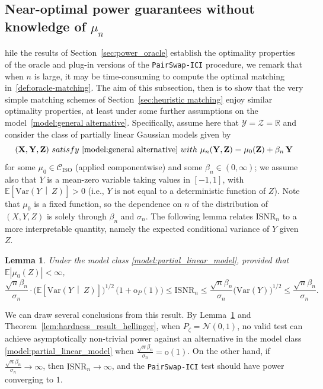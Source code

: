 \documentclass[12pt]{article}
\newtheorem{lemma}[theorem]{Lemma}
\newcommand{\R}{\mathbb{R}}
\newcommand{\EE}[1]{\mathbb{E}\left[{#1}\right]}
\newcommand{\VVst}[2]{\mathrm{Var}\left({#1}\  \middle| \ {#2}\right)}
\newcommand{\ISNR}{\mathrm{ISNR}}
\newcommand{\ISO}{\mathrm{ISO}}
\newcommand{\Ycal}{\mathcal{Y}}
\newcommand{\Zcal}{\mathcal{Z}}
\newcommand{\bX}{\mathbf{X}}
\newcommand{\bY}{\mathbf{Y}}
\newcommand{\bZ}{\mathbf{Z}}
\begin{document}
 
\subsection{Near-optimal power guarantees without knowledge of \texorpdfstring{$\mu_n$}{mu}}\label{sec:partial_linear_model}

hile the results of Section~\ref{sec:power_oracle} establish the optimality properties of the oracle and plug-in versions of the \texttt{PairSwap-ICI} procedure, we remark that when $n$ is large, it may be time-consuming to compute the optimal matching in~\eqref{def:oracle-matching}.   The aim of this subsection, then is to show that the very simple matching schemes of Section~\ref{sec:heuristic matching} enjoy similar optimality properties, at least under some further assumptions on the model~\eqref{model:general alternative}.  Specifically, assume here that $\Ycal = \Zcal=\R$ and consider the class of partially linear Gaussian models given by
\begin{equation}\label{model:partial_linear_model}
(\bX,\bY,\bZ)~\textnormal{satisfy}~\eqref{model:general alternative} \  \textnormal{with}~
 \mu_n(\bY,\bZ)=\mu_0(\bZ)+\beta_n\,\bY
\end{equation}
for some $\mu_0\in \mathcal{C}_\ISO$ (applied componentwise) and some $\beta_n\in (0,\infty)$; we assume also that $Y$ is a mean-zero variable taking values in $[-1,1]$, with $\EE{\VVst{Y}{Z}}>0$ (i.e., $Y$ is not equal to a deterministic function of $Z$).  
Note that $\mu_0$ is a fixed function, so the dependence on $n$ of the distribution of $(X,Y,Z)$ is solely through $\beta_n$ and $\sigma_n$.  The following lemma relates $\ISNR_n$ to a more interpretable quantity, namely the expected conditional variance of $Y$ given~$Z$.
\begin{lemma}\label{lemma:beta-phase-transition}
Under the model class \eqref{model:partial_linear_model}, provided that $\mathbb{E}|\mu_0(Z)| < \infty$,
    \[
    \frac{\sqrt{n}\beta_n}{\sigma_n} \cdot \bigl(\EE{\VVst{Y}{Z}}\bigr)^{1/2}\,\bigl(1 + \mathrm{o}_P(1)\bigr)\leq \ISNR_n \leq \frac{\sqrt{n}\beta_n}{\sigma_n} \bigl(\mathrm{Var}(Y)\bigr)^{1/2} \leq \frac{\sqrt{n}\beta_n}{\sigma_n} .
    \]
\end{lemma}
We can draw several conclusions from this result.
By Lemma~\ref{lemma:beta-phase-transition} and Theorem~\ref{lem:hardness_result_hellinger}, when $P_\zeta=\mathcal{N}(0,1)$, no valid test 
can achieve asymptotically non-trivial power against an alternative in the model class \eqref{model:partial_linear_model} when $\frac{\sqrt{n}\beta_n}{\sigma_n} = \mathrm{o}(1)$. On the other hand, if $\frac{\sqrt{n}\beta_n}{\sigma_n}\to \infty$, then $\ISNR_n\to\infty$, and the \textnormal{\texttt{PairSwap-ICI}} test should have power converging to $1$. %
\end{document}
